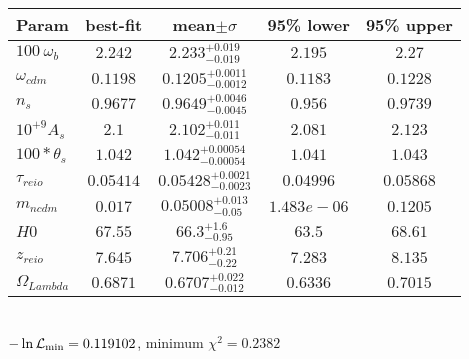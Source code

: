 \begin{tabular}{|l|c|c|c|c|} 
 \hline 
Param & best-fit & mean$\pm\sigma$ & 95\% lower & 95\% upper \\ \hline 
$100~\omega{}_{b }$ &$2.242$ & $2.233_{-0.019}^{+0.019}$ & $2.195$ & $2.27$ \\ 
$\omega{}_{cdm }$ &$0.1198$ & $0.1205_{-0.0012}^{+0.0011}$ & $0.1183$ & $0.1228$ \\ 
$n_{s }$ &$0.9677$ & $0.9649_{-0.0045}^{+0.0046}$ & $0.956$ & $0.9739$ \\ 
$10^{+9}A_{s }$ &$2.1$ & $2.102_{-0.011}^{+0.011}$ & $2.081$ & $2.123$ \\ 
$100*\theta{}_{s }$ &$1.042$ & $1.042_{-0.00054}^{+0.00054}$ & $1.041$ & $1.043$ \\ 
$\tau{}_{reio }$ &$0.05414$ & $0.05428_{-0.0023}^{+0.0021}$ & $0.04996$ & $0.05868$ \\ 
$m_{ncdm }$ &$0.017$ & $0.05008_{-0.05}^{+0.013}$ & $1.483e-06$ & $0.1205$ \\ 
$H0$ &$67.55$ & $66.3_{-0.95}^{+1.6}$ & $63.5$ & $68.61$ \\ 
$z_{reio }$ &$7.645$ & $7.706_{-0.22}^{+0.21}$ & $7.283$ & $8.135$ \\ 
$\Omega{}_{Lambda }$ &$0.6871$ & $0.6707_{-0.012}^{+0.022}$ & $0.6336$ & $0.7015$ \\ 
\hline 
 \end{tabular} \\ 
$-\ln{\cal L}_\mathrm{min} =0.119102$, minimum $\chi^2=0.2382$ \\ 
